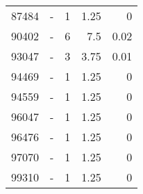 \begin{longtable}{lXrrr}
        87484 & \multicolumn{1}{X}{-} & %
          \num{1} &
          \num[round-mode=places,round-precision=2]{1.25} &
          \num[round-mode=places,round-precision=2]{0} \\

        90402 & \multicolumn{1}{X}{-} & %
          \num{6} &
          \num[round-mode=places,round-precision=2]{7.5} &
          \num[round-mode=places,round-precision=2]{0.02} \\

        93047 & \multicolumn{1}{X}{-} & %
          \num{3} &
          \num[round-mode=places,round-precision=2]{3.75} &
          \num[round-mode=places,round-precision=2]{0.01} \\

        94469 & \multicolumn{1}{X}{-} & %
          \num{1} &
          \num[round-mode=places,round-precision=2]{1.25} &
          \num[round-mode=places,round-precision=2]{0} \\

        94559 & \multicolumn{1}{X}{-} & %
          \num{1} &
          \num[round-mode=places,round-precision=2]{1.25} &
          \num[round-mode=places,round-precision=2]{0} \\

        96047 & \multicolumn{1}{X}{-} & %
          \num{1} &
          \num[round-mode=places,round-precision=2]{1.25} &
          \num[round-mode=places,round-precision=2]{0} \\

        96476 & \multicolumn{1}{X}{-} & %
          \num{1} &
          \num[round-mode=places,round-precision=2]{1.25} &
          \num[round-mode=places,round-precision=2]{0} \\

        97070 & \multicolumn{1}{X}{-} & %
          \num{1} &
          \num[round-mode=places,round-precision=2]{1.25} &
          \num[round-mode=places,round-precision=2]{0} \\

        99310 & \multicolumn{1}{X}{-} & %
          \num{1} &
          \num[round-mode=places,round-precision=2]{1.25} &
          \num[round-mode=places,round-precision=2]{0} \\


\end{longtable}
